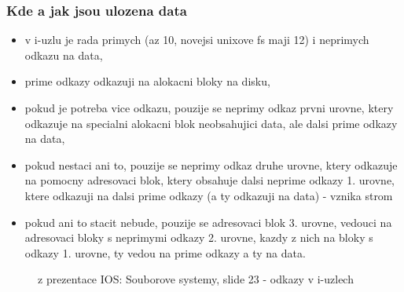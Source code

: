 \documentclass[a4paper, 11pt]{article}
\begin{document}
\subsubsection{Kde a jak jsou ulozena data}
\begin{itemize}
    \item v i-uzlu je rada primych (az 10, novejsi unixove fs maji 12) i neprimych odkazu na data,
    \item prime odkazy odkazuji na alokacni bloky na disku,
    \item pokud je potreba vice odkazu, pouzije se neprimy odkaz prvni urovne, ktery odkazuje na specialni alokacni blok neobsahujici data, ale dalsi prime odkazy na data,
    \item pokud nestaci ani to, pouzije se neprimy odkaz druhe urovne, ktery odkazuje na pomocny adresovaci blok, ktery obsahuje dalsi neprime odkazy 1. urovne, ktere odkazuji na dalsi prime odkazy (a ty odkazuji na data) - vznika strom
    \item pokud ani to stacit nebude, pouzije se adresovaci blok 3. urovne, vedouci na adresovaci bloky s neprimymi odkazy 2. urovne, kazdy z nich na bloky s odkazy 1. urovne, ty vedou na prime odkazy a ty na data.
\end{itemize}

\begin{figure}[htb]
    \centering
    \caption{z prezentace IOS: Souborove systemy, slide 23 - odkazy v i-uzlech}
\end{figure}
\end{document}
